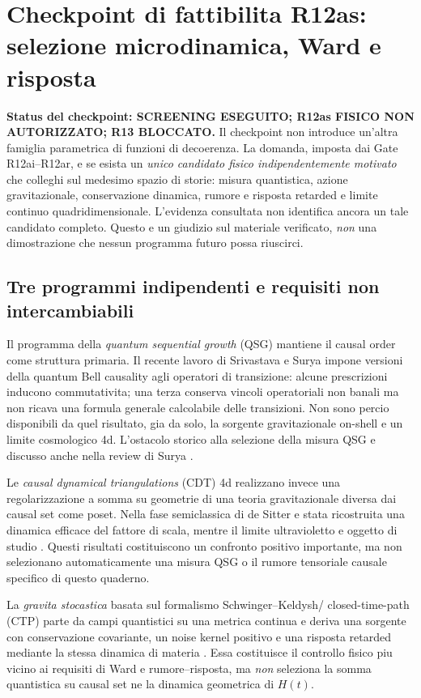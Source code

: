 \documentclass[11pt,a4paper]{article}
\newcommand{\status}[1]{\textsf{#1}}
\begin{document}
\section{Checkpoint di fattibilita R12as: selezione microdinamica, Ward e risposta}
\label{sec:r12as-screen}

\textbf{Status del checkpoint: \status{SCREENING ESEGUITO; R12as FISICO NON AUTORIZZATO; R13 BLOCCATO}.}
Il checkpoint non introduce un'altra famiglia parametrica di funzioni di decoerenza.
La domanda, imposta dai Gate R12ai--R12ar, e se esista un \emph{unico candidato fisico
indipendentemente motivato} che colleghi sul medesimo spazio di storie: misura
quantistica, azione gravitazionale, conservazione dinamica, rumore e risposta
retarded e limite continuo quadridimensionale. L'evidenza consultata non
identifica ancora un tale candidato completo. Questo e un giudizio sul materiale
verificato, \emph{non} una dimostrazione che nessun programma futuro possa riuscirci.

\subsection{Tre programmi indipendenti e requisiti non intercambiabili}

Il programma della \emph{quantum sequential growth} (QSG) mantiene il causal
order come struttura primaria. Il recente lavoro di Srivastava e Surya
\cite{SrivastavaSurya2026} impone versioni della quantum Bell causality agli
operatori di transizione: alcune prescrizioni inducono commutativita; una
terza conserva vincoli operatoriali non banali ma non ricava una formula
generale calcolabile delle transizioni. Non sono percio disponibili da quel
risultato, gia da solo, la sorgente gravitazionale on-shell e un limite
cosmologico 4d. L'ostacolo storico alla selezione della misura QSG e discusso
anche nella review di Surya \cite{Surya2019Review}.

Le \emph{causal dynamical triangulations} (CDT) 4d realizzano invece una
regolarizzazione a somma su geometrie di una teoria gravitazionale diversa
dai causal set come poset. Nella fase semiclassica di de Sitter e stata
ricostruita una dinamica efficace del fattore di scala, mentre il limite
ultravioletto e oggetto di studio \cite{GizbertStudnicki2024,Loll2019CDT}.
Questi risultati costituiscono un confronto positivo importante, ma non
selezionano automaticamente una misura QSG o il rumore tensoriale causale
specifico di questo quaderno.

La \emph{gravita stocastica} basata sul formalismo Schwinger--Keldysh/
closed-time-path (CTP) parte da campi quantistici su una metrica continua e
deriva una sorgente con conservazione covariante, un noise kernel positivo
e una risposta retarded mediante la stessa dinamica di materia
\cite{HuVerdaguer2008}. Essa costituisce il controllo fisico piu vicino ai
requisiti di Ward e rumore--risposta, ma \emph{non} seleziona la somma
quantistica su causal set ne la dinamica geometrica di $H(t)$.
\end{document}
